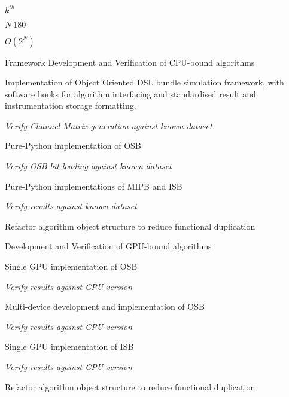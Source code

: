 {{\begin{figure}
\end{figure}%
\lthtmlfigureZ
\lthtmlcheckvsize\clearpage}

{\newpage\clearpage
{}%
$ k^{th}$%
\lthtmlinlinemathZ
\lthtmlcheckvsize\clearpage}

{\newpage\clearpage
{}%
$ N~180$%
\lthtmlinlinemathZ
\lthtmlcheckvsize\clearpage}

{\newpage\clearpage
{}%
$ O(2^N)$%
\lthtmlinlinemathZ
\lthtmlcheckvsize\clearpage}

{\newpage\clearpage
{}%
\begin{enumerate*}
  \item Framework Development and Verification of CPU-bound algorithms
  \begin{enumerate*}    \item Implementation of Object Oriented DSL bundle simulation framework, with software hooks for algorithm interfacing and standardised result and instrumentation storage formatting.
    \item \emph{Verify Channel Matrix generation against known dataset}
    \item Pure-Python implementation of OSB
    \item \emph{Verify OSB bit-loading against known dataset}
    \item Pure-Python implementations of MIPB and ISB
    \item \emph{Verify results against known dataset}
    \item Refactor algorithm object structure to reduce functional duplication
  \end{enumerate*}
  \item Development and Verification of GPU-bound algorithms
  \begin{enumerate*}    \item Single GPU implementation of OSB
    \item \emph{Verify results against CPU version}
    \item Multi-device development and implementation of OSB
    \item \emph{Verify results against CPU version}
    \item Single GPU implementation of ISB
    \item \emph{Verify results against CPU version}
    \item Refactor algorithm object structure to reduce functional duplication
  \end{enumerate*}
\end{enumerate*}%
\lthtmlfigureZ
\lthtmlcheckvsize\clearpage}

}
